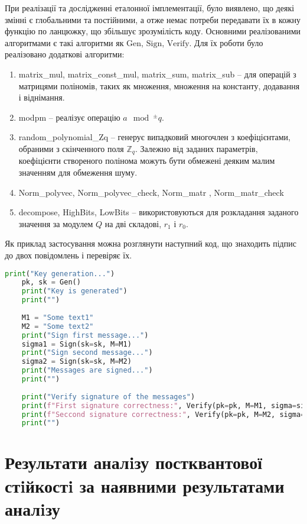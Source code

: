 \documentclass[12pt]{HomusWorkus}
\begin{document}
При реалізації та дослідженні еталонної імплементації, було виявлено, що деякі змінні є глобальними та постійними, а отже немає потреби передавати їх в кожну функцію по ланцюжку, що збільшує зрозумілість коду. Основними реалізованими алгоритмами є такі алгоритми як $\mathrm{Gen}$, $\mathrm{Sign}$, $\mathrm{Verify}$. Для їх роботи було реалізовано додаткові алгоритми:
\begin{enumerate}
    \item matrix\_mul, matrix\_const\_mul, matrix\_sum, matrix\_sub -- для операцій з матрицями поліномів, таких як множення, множення на константу, додавання і віднімання.
    \item modpm -- реалізує операцію $a \mod^{\pm} q$.
    \item random\_polynomial\_Zq -- генерує випадковий многочлен з коефіцієнтами, обраними з скінченного поля $\mathbb{Z}_q$. Залежно від заданих параметрів, коефіцієнти створеного полінома можуть бути обмежені деяким малим значенням для обмеження шуму.
    \item Norm\_polyvec, Norm\_polyvec\_check, Norm\_matr ,  Norm\_matr\_check
    \item decompose, HighBits, LowBits -- використовуються для розкладання заданого значення за модулем $Q$ на дві складові, $r_1$ і $r_0$.
\end{enumerate}

Як приклад застосування можна розглянути наступний код, що знаходить підпис до двох повідомлень і перевіряє їх.

\begin{lstlisting}[language=Python]
    print("Key generation...")
    pk, sk = Gen()
    print("Key is generated")
    print("")
    
    M1 = "Some text1"
    M2 = "Some text2"
    print("Sign first message...")
    sigma1 = Sign(sk=sk, M=M1)
    print("Sign second message...")
    sigma2 = Sign(sk=sk, M=M2)
    print("Messages are signed...")
    print("")
    
    print("Verify signature of the messages")
    print(f"First signature correctness:", Verify(pk=pk, M=M1, sigma=sigma1))
    print(f"Seccond signature correctness:", Verify(pk=pk, M=M2, sigma=sigma2))
    print("")
\end{lstlisting}

\section{Результати аналiзу постквантової стiйкостi за наявними результатами аналiзу}
\end{document}
